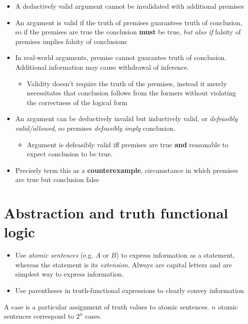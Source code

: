 \begin{itemize}
    \item A deductively valid argument cannot be invalidated with additional premises
    \item An argument is valid if the truth of premises guarantees truth of conclusion, so if the premises are true the conclusion \textbf{must} be true, \textit{but also if} falsity of premises implies falsity of conclusions
    \item In real-world arguments, premise cannot guarantee truth of conclusion. Additional information may cause withdrawal of inference.
    \begin{itemize}
        \item Validity doesn't require the truth of the premises, instead it merely necessitates that conclusion follows from the formers without violating the correctness of the logical form
    \end{itemize}
    \item An argument can be deductively invalid but inductively valid, or \textit{defeasibly valid/allowed}, so premises \textit{defeasibly imply} conclusion.
    \begin{itemize}
        \item Argument is defeasibly valid iff premises are true \textbf{and} reasonable to expect conclusion to be true.
    \end{itemize}
    \item Precisely term this as a \textbf{counterexample}, circumstance in which premises are true but conclusion false
\end{itemize}

\section{Abstraction and truth functional logic}

\begin{itemize}
    \item Use \textit{atomic sentences} (e.g. $A$ or $B$) to express information as a statement, whereas the statement is its \textit{extension}.
    Always are capital letters and are simplest way to express information.
    \item Use parentheses in truth-functional expressions to clearly convey information
\end{itemize}

\begin{definition}[Case]
    A case is a particular assignment of truth values to atomic sentences. $n$ atomic sentences correspond to $2^n$ cases.
\end{definition}


